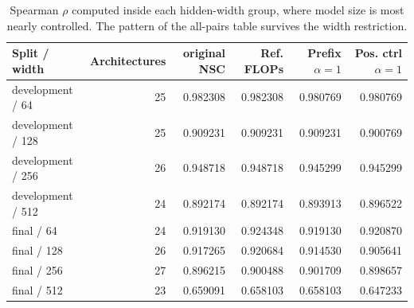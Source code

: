 \begin{table}[t]
\centering
\small
\caption{Spearman $\rho$ computed inside each hidden-width group, where model size is most nearly controlled. The pattern of the all-pairs table survives the width restriction.}
\label{tab:table7}
\setlength{\tabcolsep}{4pt}
\begin{tabular}{lrrrrr}
\toprule
Split / width & Architectures & original NSC & Ref. FLOPs & Prefix $\alpha = 1$ & Pos. ctrl $\alpha = 1$ \\
\midrule
development / 64 & 25 & 0.982308 & 0.982308 & 0.980769 & 0.980769 \\
development / 128 & 25 & 0.909231 & 0.909231 & 0.909231 & 0.900769 \\
development / 256 & 26 & 0.948718 & 0.948718 & 0.945299 & 0.945299 \\
development / 512 & 24 & 0.892174 & 0.892174 & 0.893913 & 0.896522 \\
final / 64 & 24 & 0.919130 & 0.924348 & 0.919130 & 0.920870 \\
final / 128 & 26 & 0.917265 & 0.920684 & 0.914530 & 0.905641 \\
final / 256 & 27 & 0.896215 & 0.900488 & 0.901709 & 0.898657 \\
final / 512 & 23 & 0.659091 & 0.658103 & 0.658103 & 0.647233 \\
\bottomrule
\end{tabular}
\end{table}
